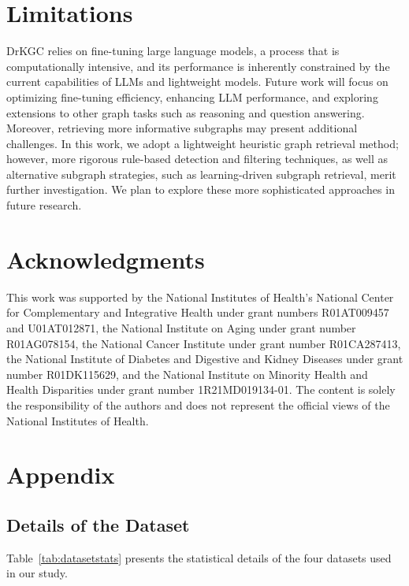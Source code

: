 \documentclass[11pt]{article}
\begin{document}
\section{Limitations}
DrKGC relies on fine-tuning large language models, a process that is computationally intensive, and its performance is inherently constrained by the current capabilities of LLMs and lightweight models. Future work will focus on optimizing fine-tuning efficiency, enhancing LLM performance, and exploring extensions to other graph tasks such as reasoning and question answering. Moreover, retrieving more informative subgraphs may present additional challenges. In this work, we adopt a lightweight heuristic graph retrieval method; however, more rigorous rule-based detection and filtering techniques, as well as alternative subgraph strategies, such as learning-driven subgraph retrieval, merit further investigation. We plan to explore these more sophisticated approaches in future research.


\section*{Acknowledgments}
This work was supported by the National Institutes of Health’s National Center for Complementary and Integrative Health under grant numbers R01AT009457 and U01AT012871, the National Institute on Aging under grant number R01AG078154, the National Cancer Institute under grant number R01CA287413, the National Institute of Diabetes and Digestive and Kidney Diseases under grant number R01DK115629, and the National Institute on Minority Health and Health Disparities under grant number 1R21MD019134-01. The content is solely the responsibility of the authors and does not represent the official views of the National Institutes of Health.

%
% 



\newpage
\appendix
\section{Appendix}
\label{sec:appendix}

\subsection{Details of the Dataset}\label{app:dataset}
Table~\ref{tab:datasetstats} presents the statistical details of the four datasets used in our study.
\end{document}
